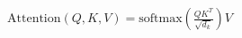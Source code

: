 \documentclass[preview]{standalone}
\begin{document}
\begin{align*}
\text{Attention}(Q, K, V) = \text{softmax}\left(\frac{QK^T}{\sqrt{d_k}}\right)V
\end{align*}
\end{document}
